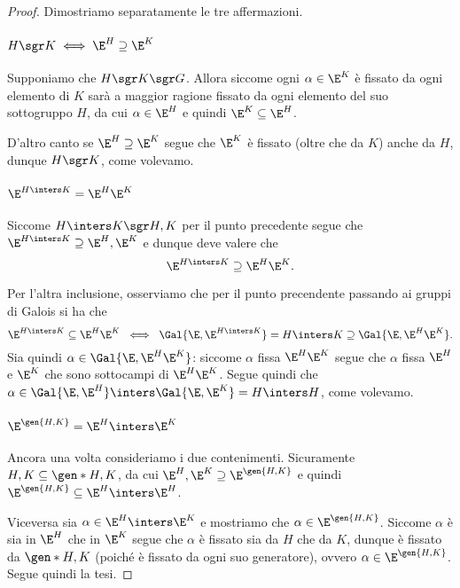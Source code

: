 \begin{proof}
    Dimostriamo separatamente le tre affermazioni.
    \paragraph{$H \sgr K \iff \E^H \supseteq \E^K$} Supponiamo che $H \sgr K \sgr G$. Allora siccome ogni $\alpha \in \E^K$ è fissato da ogni elemento di $K$ sarà a maggior ragione fissato da ogni elemento del suo sottogruppo $H$, da cui $\alpha \in \E^H$ e quindi $\E^K \subseteq \E^H$. 
    
    D'altro canto se $\E^H \supseteq \E^K$ segue che $\E^K$ è fissato (oltre che da $K$) anche da $H$, dunque $H \sgr K$, come volevamo.
    \paragraph{$\E^{H \inters K} = \E^H\E^K$}
    Siccome $H \inters K \sgr H, K$ per il punto precedente segue che $\E^{H \inters K} \supseteq \E^H, \E^K$ e dunque deve valere che \[
        \E^{H \inters K} \supseteq \E^H\E^K.
    \]

    Per l'altra inclusione, osserviamo che per il punto precendente passando ai gruppi di Galois si ha che \[
        \E^{H \inters K} \subseteq \E^H\E^K \; \iff \; \Gal{\E, \E^{H\inters K}} = H \inters K \supseteq \Gal{\E, \E^H\E^K}.
    \] Sia quindi $\alpha \in \Gal{\E, \E^H\E^K}$: siccome $\alpha$ fissa $\E^H\E^K$ segue che $\alpha$ fissa $\E^H$ e $\E^K$ che sono sottocampi di $\E^H\E^K$. Segue quindi che $\alpha \in \Gal{\E, \E^H} \inters \Gal{\E, \E^K} = H \inters H$, come volevamo.
    \paragraph{$\E^{\gen{H, K}} = \E^H \inters \E^K$}
    Ancora una volta consideriamo i due contenimenti. Sicuramente $H, K \subseteq \gen*{H, K}$, da cui $\E^H, \E^K \supseteq \E^{\gen{H, K}}$ e quindi $\E^{\gen{H, K}} \subseteq \E^H \inters \E^H$. 

    Viceversa sia $\alpha \in \E^H \inters \E^K$ e mostriamo che $\alpha \in \E^{\gen{H, K}}$. Siccome $\alpha$ è sia in $\E^H$ che in $\E^K$ segue che $\alpha$ è fissato sia da $H$ che da $K$, dunque è fissato da $\gen*{H, K}$ (poiché è fissato da ogni suo generatore), ovvero $\alpha \in \E^{\gen{H, K}}$. Segue quindi la tesi.
\end{proof}